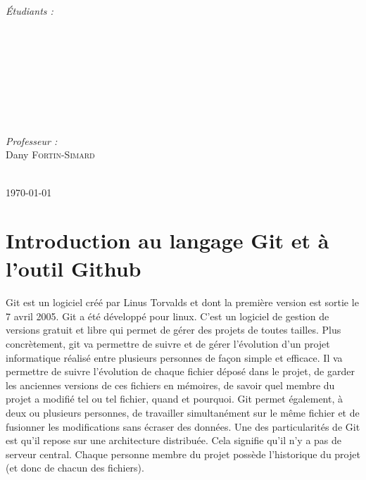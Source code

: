 \documentclass[11pt,canadien]{article}
\begin{document}
\begin{titlepage}
\begin{minipage}{0.4\textwidth}
\begin{flushleft} \large
\emph{Étudiants :}
\\ \antoine
\\ \estelle
\\ \joffrey
\\ \julien
\\ \karen
\\ \kevin
\\ \valentin
\end{flushleft}
\end{minipage}
~
\begin{minipage}{0.4\textwidth}
\begin{flushright} \large
\emph{Professeur :}\\
Dany \textsc{Fortin-Simard}
\end{flushright}
\end{minipage}\\[2cm]


{\large \today}\\[2cm]

\vfill %

\end{titlepage}

\newpage
\tableofcontents

\section{Introduction au langage Git et à l'outil Github}

\paragraph{} Git est un logiciel créé par Linus Torvalds et dont la première version est sortie le 7 avril 2005. Git a été développé pour linux. C'est un logiciel de gestion de versions gratuit et libre qui permet de gérer des projets de toutes tailles. Plus concrètement, git va permettre de suivre et de gérer l'évolution d'un projet informatique réalisé entre plusieurs personnes de façon simple et efficace. Il va permettre de suivre l'évolution de chaque fichier déposé dans le projet, de garder les anciennes versions de ces fichiers en mémoires, de savoir quel membre du projet a modifié tel ou tel fichier, quand et pourquoi. Git permet également, à deux ou plusieurs personnes, de travailler simultanément sur le même fichier et de fusionner les modifications sans écraser des données. Une des particularités de Git est qu'il repose sur une architecture distribuée. Cela signifie qu'il n'y a pas de serveur central. Chaque personne membre du projet possède l'historique du projet (et donc de chacun des fichiers).
\end{document}
